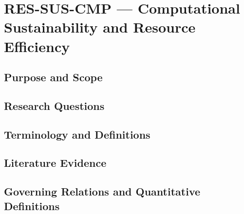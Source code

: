 
\section{RES-SUS-CMP --- Computational Sustainability and Resource Efficiency}
\label{sec:res-sus-cmp}

\subsection{Purpose and Scope}
\label{sec:res-sus-cmp-purpose}


\subsection{Research Questions}
\label{sec:res-sus-cmp-research-questions}


\subsection{Terminology and Definitions}
\label{sec:res-sus-cmp-definitions}


\subsection{Literature Evidence}
\label{sec:res-sus-cmp-literature-evidence}

%

\subsection{Governing Relations and Quantitative Definitions}
\label{sec:res-sus-cmp-governing-relations}


